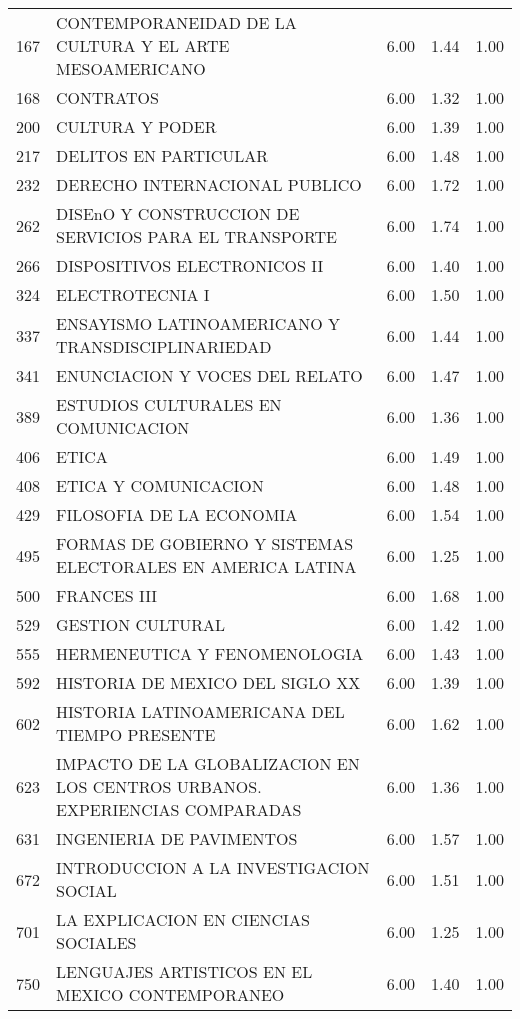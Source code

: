 \begin{table}[ht]
\begin{tabular}{rlrrr}
  167 & CONTEMPORANEIDAD DE LA CULTURA Y EL ARTE MESOAMERICANO & 6.00 & 1.44 & 1.00 \\ 
  168 & CONTRATOS & 6.00 & 1.32 & 1.00 \\ 
  200 & CULTURA Y PODER & 6.00 & 1.39 & 1.00 \\ 
  217 & DELITOS EN PARTICULAR & 6.00 & 1.48 & 1.00 \\ 
  232 & DERECHO INTERNACIONAL PUBLICO & 6.00 & 1.72 & 1.00 \\ 
  262 & DISEnO Y CONSTRUCCION DE SERVICIOS PARA EL TRANSPORTE & 6.00 & 1.74 & 1.00 \\ 
  266 & DISPOSITIVOS ELECTRONICOS II & 6.00 & 1.40 & 1.00 \\ 
  324 & ELECTROTECNIA I & 6.00 & 1.50 & 1.00 \\ 
  337 & ENSAYISMO LATINOAMERICANO Y TRANSDISCIPLINARIEDAD & 6.00 & 1.44 & 1.00 \\ 
  341 & ENUNCIACION Y VOCES DEL RELATO & 6.00 & 1.47 & 1.00 \\ 
  389 & ESTUDIOS CULTURALES EN COMUNICACION & 6.00 & 1.36 & 1.00 \\ 
  406 & ETICA & 6.00 & 1.49 & 1.00 \\ 
  408 & ETICA Y COMUNICACION & 6.00 & 1.48 & 1.00 \\ 
  429 & FILOSOFIA DE LA ECONOMIA & 6.00 & 1.54 & 1.00 \\ 
  495 & FORMAS DE GOBIERNO Y SISTEMAS ELECTORALES EN AMERICA LATINA & 6.00 & 1.25 & 1.00 \\ 
  500 & FRANCES III & 6.00 & 1.68 & 1.00 \\ 
  529 & GESTION CULTURAL & 6.00 & 1.42 & 1.00 \\ 
  555 & HERMENEUTICA Y FENOMENOLOGIA & 6.00 & 1.43 & 1.00 \\ 
  592 & HISTORIA DE MEXICO DEL SIGLO XX & 6.00 & 1.39 & 1.00 \\ 
  602 & HISTORIA LATINOAMERICANA DEL TIEMPO PRESENTE & 6.00 & 1.62 & 1.00 \\ 
  623 & IMPACTO DE LA GLOBALIZACION EN LOS CENTROS URBANOS. EXPERIENCIAS COMPARADAS & 6.00 & 1.36 & 1.00 \\ 
  631 & INGENIERIA DE PAVIMENTOS & 6.00 & 1.57 & 1.00 \\ 
  672 & INTRODUCCION A LA INVESTIGACION SOCIAL & 6.00 & 1.51 & 1.00 \\ 
  701 & LA EXPLICACION EN CIENCIAS SOCIALES & 6.00 & 1.25 & 1.00 \\ 
  750 & LENGUAJES ARTISTICOS EN EL MEXICO CONTEMPORANEO & 6.00 & 1.40 & 1.00 \\ 

\end{tabular}
\end{table}
